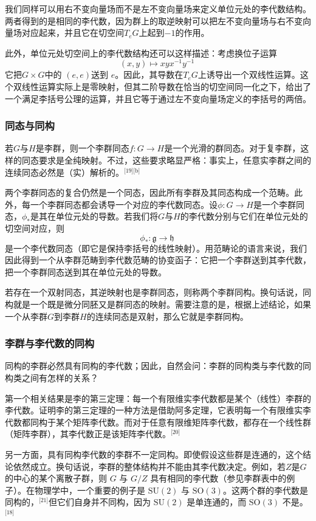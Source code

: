 我们同样可以用右不变向量场而不是左不变向量场来定义单位元处的李代数结构。两者得到的是相同的李代数，因为群上的取逆映射可以把左不变向量场与右不变向量场对应起来，并且它在切空间$T_{e}G$上起到$-1$的作用。

此外，单位元处切空间上的李代数结构还可以这样描述：考虑换位子运算
$$
(x, y) \mapsto xyx^{-1}y^{-1}~
$$
它把$G \times G$中的 $(e, e)$送到 $e$。因此，其导数在$T_{e}G$上诱导出一个双线性运算。这个双线性运算实际上是零映射，但其二阶导数在恰当的切空间同一化之下，给出了一个满足李括号公理的运算，并且它等于通过左不变向量场定义的李括号的两倍。
\subsubsection{同态与同构}
若$G$与$H$是李群，则一个李群同态$f : G \to H$是一个光滑的群同态。对于复李群，这样的同态要求是全纯映射。不过，这些要求略显严格：事实上，任意实李群之间的连续同态必然是（实）解析的。\(^\text{[19][b]}\)

两个李群同态的复合仍然是一个同态，因此所有李群及其同态构成一个范畴。此外，每一个李群同态都会诱导一个对应的李代数同态。设$\phi : G \to H$是一个李群同态，$\phi_{*}$是其在单位元处的导数。若我们将$G$与$H$的李代数分别与它们在单位元处的切空间对应，则
$$
\phi_{*} : \mathfrak{g} \to \mathfrak{h}~
$$
是一个李代数同态（即它是保持李括号的线性映射）。用范畴论的语言来说，我们因此得到一个从李群范畴到李代数范畴的协变函子：它把一个李群送到其李代数，把一个李群同态送到其在单位元处的导数。

若存在一个双射同态，其逆映射也是李群同态，则称两个李群同构。换句话说，同构就是一个既是微分同胚又是群同态的映射。需要注意的是，根据上述结论，如果一个从李群$G$到李群$H$的连续同态是双射，那么它就是李群同构。
\subsubsection{李群与李代数的同构}
同构的李群必然具有同构的李代数；因此，自然会问：李群的同构类与李代数的同构类之间有怎样的关系？

第一个相关结果是李的第三定理：每一个有限维实李代数都是某个（线性）李群的李代数。证明李的第三定理的一种方法是借助阿多定理，它表明每一个有限维实李代数都同构于某个矩阵李代数。而对于任意有限维矩阵李代数，都存在一个线性群（矩阵李群），其李代数正是该矩阵李代数。\(^\text{[20]}\)

另一方面，具有同构李代数的李群不一定同构。即使假设这些群是连通的，这个结论依然成立。换句话说，李群的整体结构并不能由其李代数决定。例如，若$Z$是$G$的中心的某个离散子群，则 $G$ 与 $G/Z$ 具有相同的李代数（参见李群表中的例子）。在物理学中，一个重要的例子是 $\mathrm{SU}(2)$ 与 $\mathrm{SO}(3)$。这两个群的李代数是同构的，\(^\text{[21]}\)但它们自身并不同构，因为 $\mathrm{SU}(2)$ 是单连通的，而 $\mathrm{SO}(3)$ 不是。\(^\text{[18]}\)

